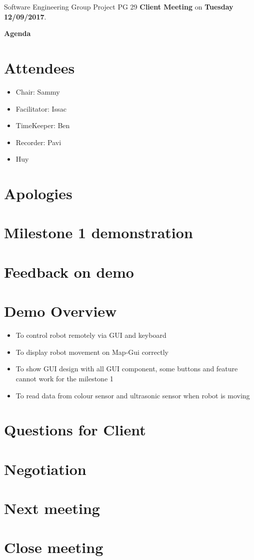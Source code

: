 \documentclass[11pt, a4paper]{article}
\begin{document}
\noindent Software Engineering Group Project PG 29 {\bf Client Meeting} on {\bf Tuesday 12/09/2017}.
\vspace*{10pt}
\begin{center}
\huge \bf Agenda
\end{center}

\section{Attendees}
\begin{itemize}
\item Chair: Sammy
\item Facilitator: Issac
\item TimeKeeper: Ben 
\item Recorder: Pavi
\item Huy
\end{itemize}

\section{Apologies}


\section{Milestone 1 demonstration}

\section{Feedback on demo} 

\section{Demo Overview}
\begin{itemize}
	\item To control robot remotely via GUI and keyboard
	\item To display robot movement on Map-Gui correctly
	\item To show GUI design with all GUI component, some buttons and feature cannot work for the milestone 1
	\item To read data from colour sensor and ultrasonic sensor when robot is moving
\end{itemize}


\section{Questions for Client}


\section{Negotiation}


\section{Next meeting}

\section {Close meeting}
\vspace*{10pt}
\end{document}
